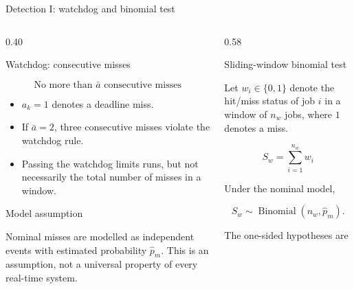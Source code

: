 \documentclass[8pt,aspectratio=169]{beamer}
\gdef\CPSOrigin{PAPER}%
\gdef\CPSSourceContext{}%
\begin{document}
\begin{frame}{Detection I: watchdog and binomial test}
\gdef\CPSSourceContext{}
\gdef\CPSOrigin{PAPER}

\footnotesize

\begin{columns}[T,onlytextwidth]

\begin{column}{0.40\textwidth}

\begin{block}{Watchdog: consecutive misses}

\[
\boxed{
\text{No more than }\bar a
\text{ consecutive misses}
}
\]

\begin{itemize}
\tightitemize
    \item $a_k=1$ denotes a deadline miss.
    \item If $\bar a=2$, three consecutive misses violate
    the watchdog rule.
    \item Passing the watchdog limits runs, but not necessarily
    the total number of misses in a window.
\end{itemize}

\end{block}

\begin{block}{Model assumption}

\scriptsize
Nominal misses are modelled as independent events with
estimated probability $\hat p_m$. This is an assumption,
not a universal property of every real-time system.
\end{block}

\end{column}


\begin{column}{0.58\textwidth}

\begin{block}{Sliding-window binomial test}

Let $w_i\in\{0,1\}$ denote the hit/miss status of job $i$
in a window of $n_w$ jobs, where $1$ denotes a miss.

\[
S_w=\sum_{i=1}^{n_w}w_i
\]

Under the nominal model,

\[
S_w\sim\operatorname{Binomial}(n_w,\hat p_m).
\]

The one-sided hypotheses are


\end{block}
\end{column}
\end{columns}
\end{frame}
\end{document}
